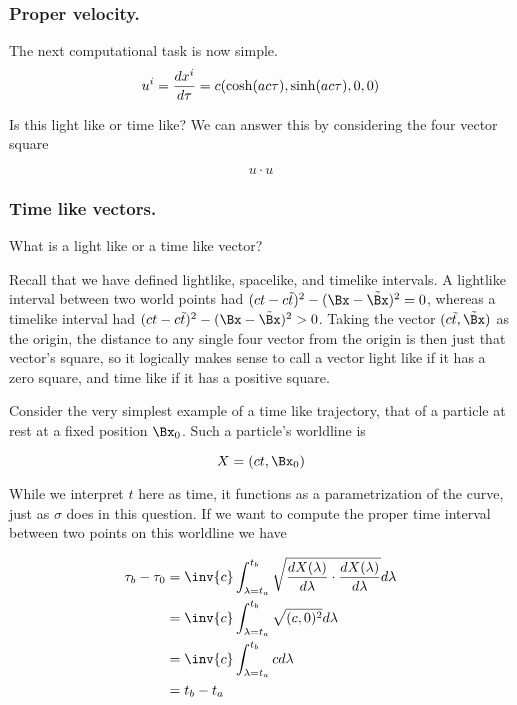 \subsubsection{Proper velocity.}

The next computational task is now simple.
\begin{equation}\label{eqn:relativisticElectrodynamicsT2:77}
u^i
= \frac{dx^i}{d\tau} 
= c ( \cosh( a c \tau ), \sinh( a c \tau ), 0, 0) \\
\end{equation}

Is this light like or time like?  We can answer this by considering the four vector square

\begin{equation}\label{eqn:relativisticElectrodynamicsT2:80}
u \cdot u 
\end{equation}

\subsubsection{Time like vectors.}

What is a light like or a time like vector?

Recall that we have defined lightlike, spacelike, and timelike intervals.  A lightlike interval between two world points had $(ct - c\tilde{t})^2 - (\Bx -\tilde{\Bx})^2 = 0$, whereas a timelike interval had $(ct - c\tilde{t})^2 - (\Bx -\tilde{\Bx})^2 > 0$.  Taking the vector $(c \tilde{t}, \tilde{\Bx})$ as the origin, the distance to any single four vector from the origin is then just that vector's square, so it logically makes sense to call a vector light like if it has a zero square, and time like if it has a positive square.

Consider the very simplest example of a time like trajectory, that of a particle at rest at a fixed position $\Bx_0$.  Such a particle's worldline is

\begin{equation}\label{eqn:relativisticElectrodynamicsT2:71}
X = ( c t, \Bx_0 )
\end{equation}

While we interpret $t$ here as time, it functions as a parametrization of the curve, just as $\sigma$ does in this question.  If we want to compute the proper time interval between two points on this worldline we have

\begin{align*}
\tau_b - \tau_0 
&=
\inv{c} \int_{\lambda = t_a}^{t_b} \sqrt{ \frac{dX(\lambda)}{d\lambda} \cdot \frac{dX(\lambda)}{d\lambda} } d\lambda \\
&=
\inv{c} \int_{\lambda = t_a}^{t_b} \sqrt{ (c, 0)^2 } d\lambda \\
&=
\inv{c} \int_{\lambda = t_a}^{t_b} c d\lambda \\
&= t_b - t_a
\end{align*}

